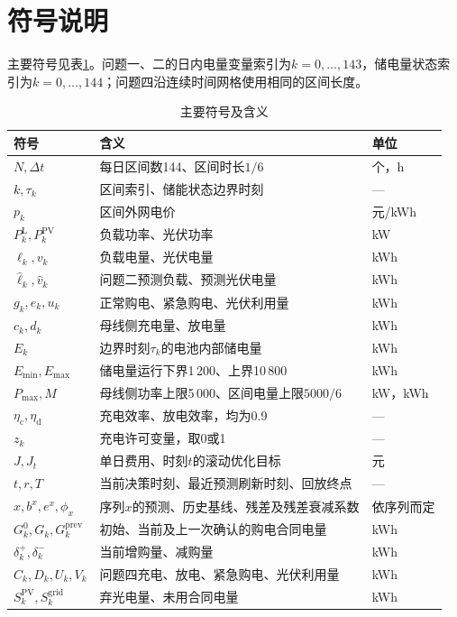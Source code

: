 \clearpage
\section{符号说明}
主要符号见表\ref{tab:notation}。问题一、二的日内电量变量索引为$k=0,\ldots,143$，储电量状态索引为$k=0,\ldots,144$；问题四沿连续时间网格使用相同的区间长度。
\begin{table}[H]
\centering
\caption{主要符号及含义}
\label{tab:notation}
\small
\begin{tabular}{lp{8.3cm}l}
\toprule
符号 & 含义 & 单位 \\
\midrule
$N,\Delta t$ & 每日区间数144、区间时长$1/6$ & 个，h \\
$k,\tau_k$ & 区间索引、储能状态边界时刻 & --- \\
$p_k$ & 区间外网电价 & 元/kWh \\
$P_k^{\mathrm L},P_k^{\mathrm{PV}}$ & 负载功率、光伏功率 & kW \\
$\ell_k,v_k$ & 负载电量、光伏电量 & kWh \\
$\widehat\ell_k,\widehat v_k$ & 问题二预测负载、预测光伏电量 & kWh \\
$g_k,e_k,u_k$ & 正常购电、紧急购电、光伏利用量 & kWh \\
$c_k,d_k$ & 母线侧充电量、放电量 & kWh \\
$E_k$ & 边界时刻$\tau_k$的电池内部储电量 & kWh \\
$E_{\min},E_{\max}$ & 储电量运行下界1\,200、上界10\,800 & kWh \\
$P_{\max},M$ & 母线侧功率上限5\,000、区间电量上限$5000/6$ & kW，kWh \\
$\eta_{\mathrm c},\eta_{\mathrm d}$ & 充电效率、放电效率，均为0.9 & --- \\
$z_k$ & 充电许可变量，取0或1 & --- \\
$J,J_t$ & 单日费用、时刻$t$的滚动优化目标 & 元 \\
\midrule
$t,r,T$ & 当前决策时刻、最近预测刷新时刻、回放终点 & --- \\
$\widehat x,b^x,e^x,\phi_x$ & 序列$x$的预测、历史基线、残差及残差衰减系数 & 依序列而定 \\
$G_k^0,G_k,G_k^{\mathrm{prev}}$ & 初始、当前及上一次确认的购电合同电量 & kWh \\
$\delta_k^+,\delta_k^-$ & 当前增购量、减购量 & kWh \\
$C_k,D_k,U_k,V_k$ & 问题四充电、放电、紧急购电、光伏利用量 & kWh \\
$S_k^{\mathrm{PV}},S_k^{\mathrm{grid}}$ & 弃光电量、未用合同电量 & kWh \\

\end{tabular}
\end{table}
